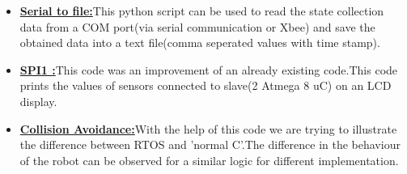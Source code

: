 \documentclass[a4paper,12pt,oneside]{book}
\begin{document}
\begin{itemize}
\newpage

\\
\item \textbf{\href{https://github.com/eYSIP-2016/RTOS_LPC2148/tree/master/Codes/serial_com}{Serial to file:}}This python script can be used to read the state collection data from a COM port(via serial communication or Xbee) and save the obtained data into a text file(comma seperated values with time stamp).
\\

\item \textbf{\href{https://github.com/eYSIP-2016/RTOS_LPC2148/tree/master/Codes/SPI_ADC}{SPI1 :}}This code was an improvement of an already existing code.This code prints the values of sensors connected to slave(2 Atmega 8 uC) on an LCD display.
\\
\item \textbf{\href{https://github.com/eYSIP-2016/RTOS_LPC2148/tree/master/Codes/Collision\%20avoidance}{Collision Avoidance:}}With the help of this code we are trying to illustrate the difference between RTOS and 'normal C'.The difference in the behaviour of the robot can be observed for a similar logic for different implementation.
\end{itemize}

\newpage


\end{document}

